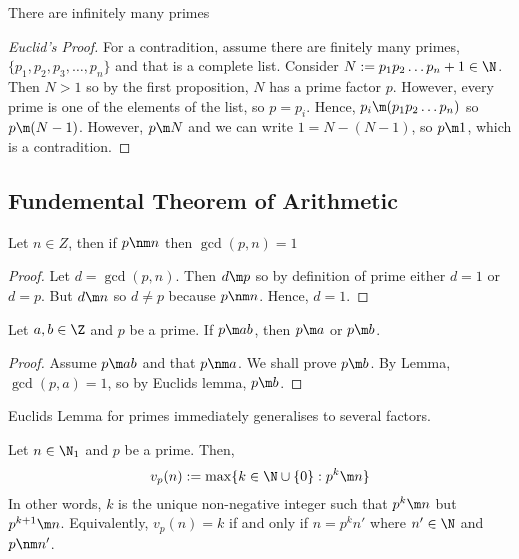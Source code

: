 \begin{nthm}
  There are infinitely many primes
\end{nthm}

\begin{proof}[Euclid's Proof]
  For a contradition, assume there are finitely many primes, $\{p_1, p_2, p_3, \dots, p_n\}$ and that is a complete list. Consider $N := p_1p_2\dots p_n + 1 \in \N$. Then $N > 1$ so by the first proposition, $N$ has a prime factor $p$. However, every prime is one of the elements of the list, so $p = p_i$. Hence, $p_i \m (p_1p_2\dots p_n)$ so $p \m (N - 1)$. However, $p \m N$ and we can write $1 = N - (N - 1)$, so $p \m 1$, which is a contradition.
\end{proof}

\subsection{Fundemental Theorem of Arithmetic}

\begin{nlemma}
  Let $n \in Z$, then if $p \nm n$ then $\gcd(p,n)=1$
\end{nlemma}
\begin{proof}
  Let $d = \gcd(p, n)$. Then $d \m p$ so by definition of prime either $d = 1$ or $d = p$. But $d \m n$ so $d \ne p$ because $p \nm n$. Hence, $d = 1$.
\end{proof}

\begin{nthm}
  Let $a, b \in \Z$ and $p$ be a prime. If $p \m ab$, then $p \m a$ or $p \m b$.
\end{nthm}
\begin{proof}
  Assume $p \m ab$ and that $p \nm a$. We shall prove $p \m b$. By Lemma, $\gcd(p, a) = 1$, so by Euclids lemma, $p \m b$.
\end{proof}

\begin{remark}
   Euclids Lemma for primes immediately generalises to several factors.
\end{remark}

\begin{ndefi}[]
  Let $n\in \N_1$ and $p$ be a prime. Then,
  $$ v_p (n) := \max \{k \in \N \cup \{0\} : p^k \m n\}  $$
  In other words, $k$ is the unique non-negative integer such that $p^k \m n$ but $p^{k+1} \m n$. Equivalently, $v_p (n) = k$ if and only if $n = p^k n'$ where $n' \in \N$ and $p \nm n'$.
\end{ndefi}

